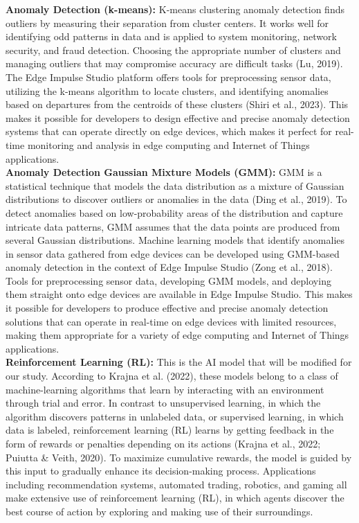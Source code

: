 \documentclass[a4paper,11pt,onecolumn]{article}
\begin{document}
\textbf{Anomaly Detection (k-means):} K-means clustering anomaly detection finds outliers by measuring their separation from cluster centers. It works well for identifying odd patterns in data and is applied to system monitoring, network security, and fraud detection. Choosing the appropriate number of clusters and managing outliers that may compromise accuracy are difficult tasks (Lu, 2019). The Edge Impulse Studio platform offers tools for preprocessing sensor data, utilizing the k-means algorithm to locate clusters, and identifying anomalies based on departures from the centroids of these clusters (Shiri et al., 2023). This makes it possible for developers to design effective and precise anomaly detection systems that can operate directly on edge devices, which makes it perfect for real-time monitoring and analysis in edge computing and Internet of Things applications.\\
\textbf{Anomaly Detection Gaussian Mixture Models (GMM):} GMM is a statistical technique that models the data distribution as a mixture of Gaussian distributions to discover outliers or anomalies in the data (Ding et al., 2019). To detect anomalies based on low-probability areas of the distribution and capture intricate data patterns, GMM assumes that the data points are produced from several Gaussian distributions. Machine learning models that identify anomalies in sensor data gathered from edge devices can be developed using GMM-based anomaly detection in the context of Edge Impulse Studio (Zong et al., 2018). Tools for preprocessing sensor data, developing GMM models, and deploying them straight onto edge devices are available in Edge Impulse Studio. This makes it possible for developers to produce effective and precise anomaly detection solutions that can operate in real-time on edge devices with limited resources, making them appropriate for a variety of edge computing and Internet of Things applications.\\
\textbf{Reinforcement Learning (RL):} This is the AI model that will be modified for our study. According to Krajna et al. (2022), these models belong to a class of machine-learning algorithms that learn by interacting with an environment through trial and error. In contrast to unsupervised learning, in which the algorithm discovers patterns in unlabeled data, or supervised learning, in which data is labeled, reinforcement learning (RL) learns by getting feedback in the form of rewards or penalties depending on its actions (Krajna et al., 2022; Puiutta & Veith, 2020). To maximize cumulative rewards, the model is guided by this input to gradually enhance its decision-making process. Applications including recommendation systems, automated trading, robotics, and gaming all make extensive use of reinforcement learning (RL), in which agents discover the best course of action by exploring and making use of their surroundings.\\
\end{document}
